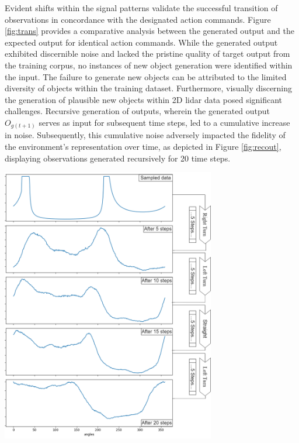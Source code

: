 \documentclass[12pt,twoside,a4paper,parskip]{scrbook} %
\begin{document}
Evident shifts within the signal patterns validate the successful transition of observations in concordance with the designated action commands. Figure \ref{fig:trans} provides a comparative analysis between the generated output and the expected output for identical action commands.
While the generated output exhibited discernible noise and lacked the pristine quality of target output from the training corpus, no instances of new object generation were identified within the input.
The failure to generate new objects can be attributed to the limited diversity of objects within the training dataset. Furthermore, visually discerning the generation of plausible new objects within 2D lidar data posed significant challenges.
Recursive generation of outputs, wherein the generated output $O_{g(t+1)}$ serves as input for subsequent time steps, led to a cumulative increase in noise. Subsequently, this cumulative noise adversely impacted the fidelity of the environment's representation over time, as depicted in Figure \ref{fig:recout}, displaying observations generated recursively for 20 time steps.

\begin{minipage}[t]{\linewidth}
        \centering
        \includegraphics[width=0.70\textwidth]{Images/recout.png}
        \label{fig:recout}
        \vspace{-\baselineskip} %
    \end{minipage}
    \hfill
\end{document}
